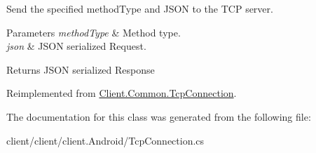 Send the specified method\+Type and J\+S\+O\+N to the T\+C\+P server. 


\begin{DoxyParams}{Parameters}
{\em method\+Type} & Method type.\\
\hline
{\em json} & J\+S\+O\+N serialized Request.\\
\hline
\end{DoxyParams}
\begin{DoxyReturn}{Returns}
J\+S\+O\+N serialized Response
\end{DoxyReturn}


Reimplemented from \hyperlink{classClient_1_1Common_1_1TcpConnection_a2d0457442421976a677e6f24a14a92eb}{Client.\+Common.\+Tcp\+Connection}.



The documentation for this class was generated from the following file\+:\begin{DoxyCompactItemize}
\item 
client/client/client.\+Android/Tcp\+Connection.\+cs\end{DoxyCompactItemize}
